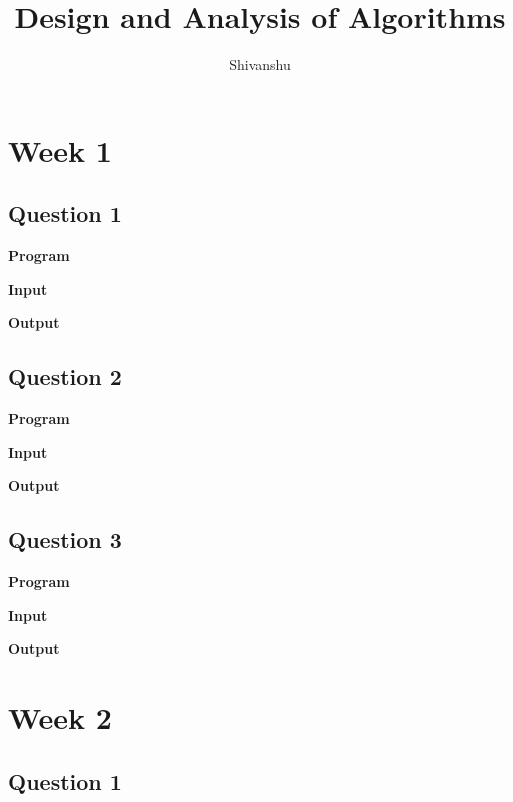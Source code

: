 \documentclass{article}
\title{Design and Analysis of Algorithms}
\author{Shivanshu}
\begin{document}
\maketitle
\newpage

\tableofcontents
\newpage

\section{Week 1}

\subsection{Question 1}

\newline 

\noindent \textbf{\large{Program}}

\newpage
\noindent \textbf{\large{Input}}

\noindent \textbf{\large{Output}}


\newpage
\subsection{Question 2}

\newline 

\noindent \textbf{\large{Program}}

\newpage
\noindent \textbf{\large{Input}}

\noindent \textbf{\large{Output}}


\newpage
\subsection{Question 3}

\newline 

\noindent \textbf{\large{Program}}

\newpage
\noindent \textbf{\large{Input}}

\noindent \textbf{\large{Output}}


\newpage
\section{Week 2}

\subsection{Question 1}

\newline 
\end{document}
